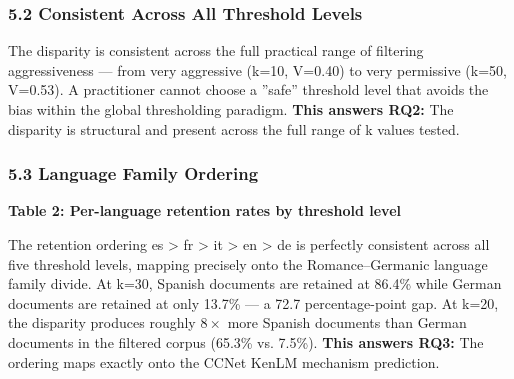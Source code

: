 \subsubsection{5.2 Consistent Across All Threshold Levels}

The disparity is consistent across the full practical range of filtering aggressiveness --- from very aggressive (k=10, V=0.40) to very permissive (k=50, V=0.53). A practitioner cannot choose a ''safe'' threshold level that avoids the bias within the global thresholding paradigm. \textbf{This answers RQ2:} The disparity is structural and present across the full range of k values tested.

\subsubsection{5.3 Language Family Ordering}

\textbf{Table 2: Per-language retention rates by threshold level}

\begin{table}[htbp]
\centering
{}
\end{table}

The retention ordering es > fr > it > en > de is perfectly consistent across all five threshold levels, mapping precisely onto the Romance--Germanic language family divide. At k=30, Spanish documents are retained at 86.4\% while German documents are retained at only 13.7\% --- a 72.7 percentage-point gap. At k=20, the disparity produces roughly $8\times$ more Spanish documents than German documents in the filtered corpus (65.3\% vs. 7.5\%). \textbf{This answers RQ3:} The ordering maps exactly onto the CCNet KenLM mechanism prediction.

